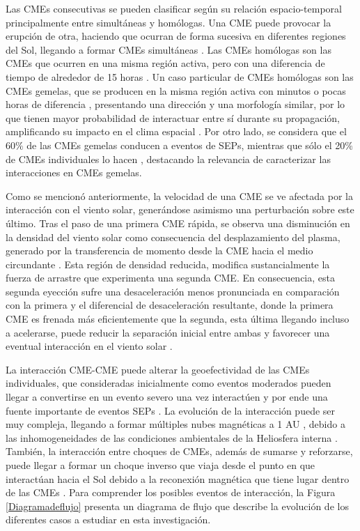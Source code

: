 Las CMEs consecutivas se pueden clasificar según su relación espacio-temporal principalmente entre simultáneas y homólogas. Una CME puede provocar la erupción de otra, haciendo que ocurran de forma sucesiva en diferentes regiones del Sol, llegando a formar CMEs simultáneas \parencite[e.g.,][]{Pevtsov_2000, moon-2003}. Las CMEs homólogas son las CMEs que ocurren en una misma región activa, pero con una diferencia de tiempo de alrededor de 15 horas \parencite[e.g.,][]{lugaz-2017, zhang-2002}. Un caso particular de CMEs homólogas son las CMEs gemelas, que se producen en la misma región activa con minutos o pocas horas de diferencia \parencite[e.g.,][]{shen-2013, vasanth-2025, li-2012}, presentando una dirección y una morfología similar, por lo que tienen mayor probabilidad de interactuar entre sí durante su propagación, amplificando su impacto en el clima espacial \parencite[]{McDougall2025}. Por otro lado, se considera que el 60$\%$ de las CMEs gemelas conducen a eventos de SEPs, mientras que sólo el 20$\%$ de CMEs individuales lo hacen \parencite[][]{lugaz-2017}, destacando la relevancia de caracterizar las interacciones en CMEs gemelas.

Como se mencionó anteriormente, la velocidad de una CME se ve afectada por la interacción con el viento solar, generándose asimismo una perturbación sobre este último. Tras el paso de una primera CME rápida, se observa una disminución en la densidad del viento solar como consecuencia del desplazamiento del plasma, generado por la transferencia de momento desde la CME hacia el medio circundante \parencite[e.g.,][]{lugaz-2005a}. Esta región de densidad reducida, modifica sustancialmente la fuerza de arrastre que experimenta una segunda CME. En consecuencia, esta segunda eyección sufre una desaceleración menos pronunciada en comparación con la primera y el diferencial de desaceleración resultante, donde la primera CME es frenada más eficientemente que la segunda, esta última llegando incluso a acelerarse, puede reducir la separación inicial entre ambas y favorecer una eventual interacción en el viento solar \parencite[e.g.,][]{zhou-2021}.

La interacción CME-CME puede alterar la geoefectividad de las CMEs individuales, que consideradas inicialmente como eventos moderados pueden llegar a convertirse en un evento severo una vez interactúen \parencite[e.g.,][]{gopalswamy-2001, koehn-2022} y por ende una fuente importante de eventos SEPs \parencite[e.g.,][]{ruffenach-2012, temmer-2021}. La evolución de la interacción puede ser muy compleja, llegando a formar múltiples nubes magnéticas a 1 AU \parencite[e.g.,][]{gonzalez-esparza-2004}, debido a las inhomogeneidades de las condiciones ambientales de la Heliosfera interna \parencite[e.g.,][]{mayank-2023}. También, la interacción entre choques de CMEs, además de sumarse y reforzarse, puede llegar a formar un choque inverso que viaja desde el punto en que interactúan hacia el Sol debido a la reconexión magnética que tiene lugar dentro de las CMEs \parencite[e.g.,][]{lugaz-2005}. Para comprender los posibles eventos de interacción, la Figura \ref{Diagramadeflujo} presenta un diagrama de flujo que describe la evolución de los diferentes casos a estudiar en esta investigación.

